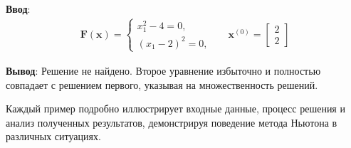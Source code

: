 \textbf{Ввод}: 
\begin{align*}
\mathbf{F}(\mathbf{x}) = \begin{cases}
x_1^2 - 4 = 0,\\
(x_1 - 2)^2 = 0,
\end{cases}
&& \mathbf{x}^{(0)} = \begin{bmatrix}
2 \\
2
\end{bmatrix}
\end{align*}

\textbf{Вывод}: Решение не найдено. Второе уравнение избыточно и полностью совпадает с решением первого, указывая на множественность решений.

Каждый пример подробно иллюстрирует входные данные, процесс решения и анализ полученных результатов, демонстрируя поведение метода Ньютона в различных ситуациях.

